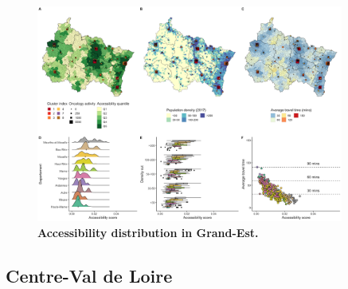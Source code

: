\begin{figure}[H]
    \includegraphics[width=0.9\textwidth]{images/camion/region_accessibility/accessibility_Grand-Est.png}
    \centering
    \caption{
        \textbf{Accessibility distribution in Grand-Est.}
    }
\end{figure}

\subsection*{Centre-Val de Loire}

